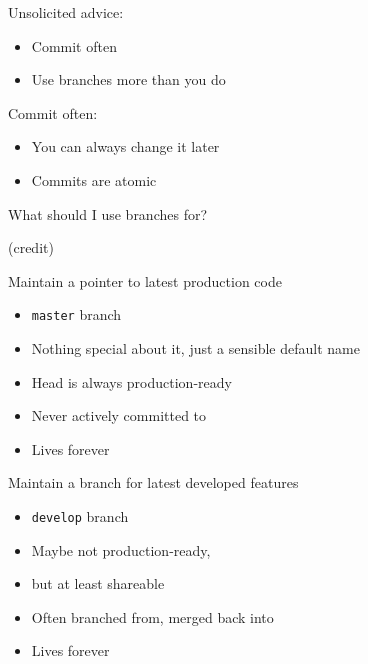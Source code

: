 \documentclass{beamer}
\begin{document}
\begin{frame}[plain]
Unsolicited advice:
\begin{itemize}
\item Commit often
\item Use branches more than you do
\end{itemize}

\end{frame}


\begin{frame}[plain]
Commit often:
  \begin{itemize}
  \item You can always change it later
  \item Commits are atomic
  \end{itemize}
\end{frame}


\begin{frame}[plain]
What should I use branches for?  
\end{frame}


\begin{frame}[plain]
(credit)
\end{frame}

\begin{frame}[plain]

  Maintain a pointer to latest production code

  \begin{itemize}
  \item {\tt master} branch
  \item Nothing special about it, just a sensible default name
  \item Head is always production-ready
  \item Never actively committed to
  \item Lives forever
  \end{itemize}

\end{frame}

\begin{frame}[plain]

  Maintain a branch for latest developed features

  \begin{itemize}
  \item {\tt develop} branch
  \item Maybe not production-ready,
  \item but at least shareable
  \item Often branched from, merged back into
  \item Lives forever
  \end{itemize}

\end{frame}
\end{document}
